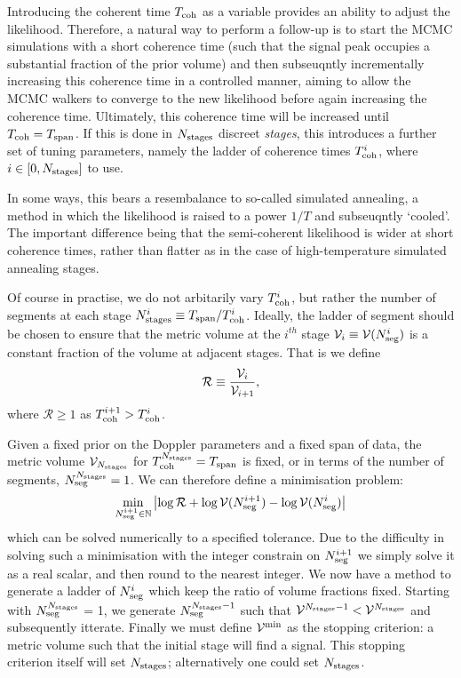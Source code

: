 \documentclass[aps, prd, twocolumn, superscriptaddress, floatfix, showpacs, nofootinbib, longbibliography]{revtex4-1}
\begin{document}
Introducing the coherent time $T_{\rm coh}$ as a variable provides an ability to
adjust the likelihood. Therefore, a natural way to perform a follow-up is to
start the MCMC simulations with a short coherence time (such that the signal
peak occupies a substantial fraction of the prior volume) and then subseuqntly
incrementally increasing this coherence time in a controlled manner,
aiming to allow the MCMC walkers to converge to the new likelihood before again
increasing the coherence time. Ultimately, this coherence time will be increased
until $T_{\rm coh} = T_{\rm span}$. If this is done in $N_{\rm stages}$ discreet \emph{stages},
this introduces a further set of tuning parameters, namely the ladder of
coherence times $T_{\rm coh}^{i}$, where $i \in [0, N_{\rm stages}]$ to use.

In some ways, this bears a resembalance to so-called simulated annealing, a
method in which the likelihood is raised to a power $1/T$ and subseuqntly
`cooled'. The important difference being that the semi-coherent likelihood is
wider at short coherence times, rather than flatter as in the case of
high-temperature simulated annealing stages.

Of course in practise, we do not arbitarily vary $T_{\rm coh}^i$, but rather the
number of segments at each stage $N_{\rm stages}^{i}\equiv T_{\rm span}/T_{\rm coh}^{i}$.
Ideally, the ladder of segment should be chosen to ensure that the
metric volume at the $i^{th}$ stage $\mathcal{V}_i \equiv \mathcal{V}(N_{\rm seg}^i)$ is a constant
fraction of the volume at adjacent stages. That is we define
\begin{equation}
\mathcal{R} \equiv \frac{\mathcal{V}_i}{\mathcal{V}_{i+1}},
\end{equation}
where $\mathcal{R} \ge 1$ as $T_{\rm coh}^{i+1} > T_{\rm coh}^{i}$.

Given a fixed prior on the Doppler parameters and a fixed span of data, the
metric volume $\mathcal{V}_{N_{\rm stages}}$ for $T_{\rm coh}^{N_{\rm stages}} = T_{\rm span}$ is fixed, or in
terms of the number of segments, $N_{\rm seg}^{N_{\rm stages}} = 1$.
We can therefore define a minimisation problem:
\begin{align}
\min_{N_{\rm seg}^{i+1} \in \mathbb{N}}
\left| \log\mathcal{R} + \log\mathcal{V}(N_{\rm seg}^{i+1}) - \log\mathcal{V}(N_{\rm seg}^i)\right|
\end{align}
which can be solved numerically to a specified tolerance. Due to the difficulty
in solving such a minimisation with the integer constrain on $N_{\rm seg}^{i+1}$ we
simply solve it as a real scalar, and then round to the nearest integer. We now
have a method to generate a ladder of $N_{\rm seg}^{i}$ which keep the ratio of
volume fractions fixed. Starting with $N_{\rm seg}^{N_{\rm stages}}$ = 1, we generate
$N_{\rm seg}^{N_{\rm stages}-1}$ such that $\mathcal{V}^{N_{\rm stages}-1} < \mathcal{V}^{N_{\rm stages}}$ and
subsequently itterate.  Finally we must define $\mathcal{V}^{\rm min}$ as the stopping
criterion: a metric volume such that the initial stage will find a signal. This
stopping criterion itself will set $N_{\rm stages}$; alternatively one could set
$N_{\rm stages}$.
\end{document}
